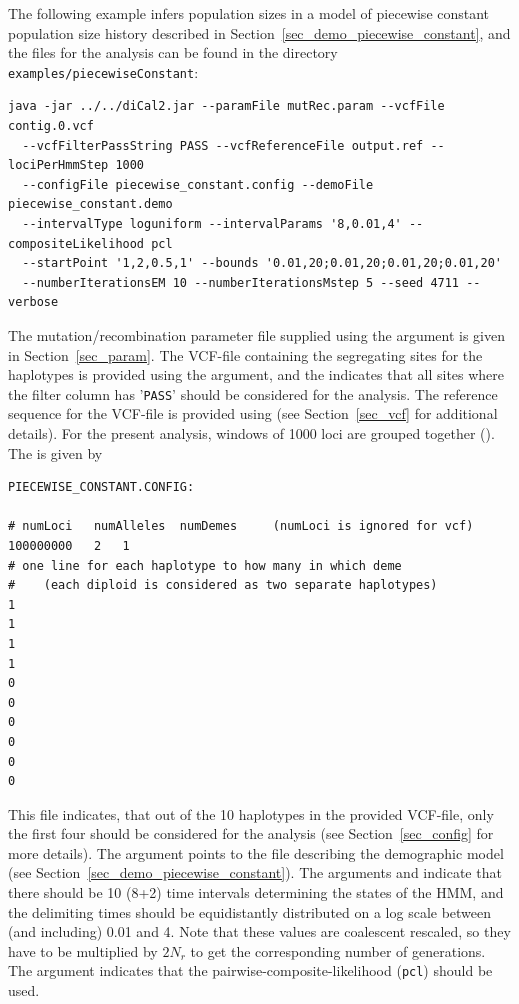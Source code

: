 \documentclass{article}
\numberwithin{equation}{section}
\begin{document}
The following example infers population sizes in a model of piecewise constant population size history described in Section~\ref{sec_demo_piecewise_constant}, and the files for the analysis can be found in the directory \texttt{examples/piecewiseConstant}:

\begin{verbatim}
java -jar ../../diCal2.jar --paramFile mutRec.param --vcfFile contig.0.vcf
  --vcfFilterPassString PASS --vcfReferenceFile output.ref --lociPerHmmStep 1000
  --configFile piecewise_constant.config --demoFile piecewise_constant.demo
  --intervalType loguniform --intervalParams '8,0.01,4' --compositeLikelihood pcl
  --startPoint '1,2,0.5,1' --bounds '0.01,20;0.01,20;0.01,20;0.01,20' 
  --numberIterationsEM 10 --numberIterationsMstep 5 --seed 4711 --verbose
\end{verbatim}

The mutation/recombination parameter file supplied using the  argument is given in Section~\ref{sec_param}. The VCF-file containing the segregating sites for the haplotypes is provided using the  argument, and the  indicates that all sites where the filter column has '\texttt{PASS}' should be considered for the analysis. The reference sequence for the VCF-file is provided using  (see Section~\ref{sec_vcf} for additional details). For the present analysis, windows of 1000 loci are grouped together (). The  is given by

\begin{verbatim}
PIECEWISE_CONSTANT.CONFIG:

# numLoci	numAlleles	numDemes	 (numLoci is ignored for vcf)
100000000	2	1
# one line for each haplotype to how many in which deme
#    (each diploid is considered as two separate haplotypes)
1
1
1
1
0
0
0
0
0
0
\end{verbatim}

This file indicates, that out of the 10 haplotypes in the provided VCF-file, only the first four should be considered for the analysis (see Section~\ref{sec_config} for more details). The argument  points to the file describing the demographic model (see Section~\ref{sec_demo_piecewise_constant}). The arguments  and  indicate that there should be 10 (8+2) time intervals determining the states of the HMM, and the delimiting times should be equidistantly distributed on a log scale between (and including) 0.01 and 4. Note that these values are coalescent rescaled, so they have to be multiplied by $2N_r$ to get the corresponding number of generations. The argument  indicates that the pairwise-composite-likelihood (\texttt{pcl}) should be used.
\end{document}
